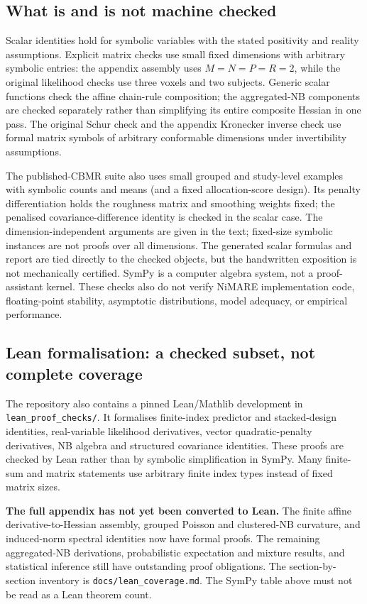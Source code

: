 \documentclass[11pt,a4paper]{article}
\numberwithin{equation}{section}
\begin{document}
\subsection{What is and is not machine checked}
Scalar identities hold for symbolic variables with the stated positivity
and reality assumptions. Explicit matrix checks use small fixed dimensions
with arbitrary symbolic entries: the appendix assembly uses
$M=N=P=R=2$, while the original likelihood checks use three voxels and two
subjects. Generic scalar functions check the affine chain-rule composition;
the aggregated-NB components are checked separately rather than simplifying
its entire composite Hessian in one pass. The original Schur check and the
appendix Kronecker inverse check use formal matrix symbols of arbitrary
conformable dimensions under invertibility assumptions.

The published-CBMR suite also uses small grouped and study-level examples
with symbolic counts and means (and a fixed allocation-score design).
Its penalty differentiation holds the roughness matrix and smoothing
weights fixed; the penalised covariance-difference identity is checked
in the scalar case.
The dimension-independent arguments are given in the text; fixed-size
symbolic instances are not proofs over all dimensions. The generated scalar
formulas and report are tied directly to the checked objects, but the
handwritten exposition is not mechanically certified. SymPy is a computer
algebra system, not a proof-assistant kernel. These checks also do not verify
NiMARE implementation code, floating-point stability, asymptotic
distributions, model adequacy, or empirical performance.

\subsection{Lean formalisation: a checked subset, not complete coverage}
The repository also contains a pinned Lean/Mathlib development in
\texttt{lean_proof_checks/}. It formalises finite-index predictor and stacked-design
identities, real-variable likelihood derivatives, vector quadratic-penalty
derivatives, NB algebra and structured covariance identities.
These proofs are checked by Lean rather than by symbolic
simplification in SymPy. Many finite-sum and matrix statements use arbitrary
finite index types instead of fixed matrix sizes.

\textbf{The full appendix has not yet been converted to Lean.}
The finite affine derivative-to-Hessian assembly, grouped Poisson and
clustered-NB curvature, and induced-norm spectral identities now have
formal proofs. The remaining aggregated-NB derivations, probabilistic
expectation and mixture results, and statistical inference still have
outstanding proof obligations. The section-by-section inventory is
\texttt{docs/lean\_coverage.md}. The SymPy table above must not be read as a
Lean theorem count.
\end{document}
